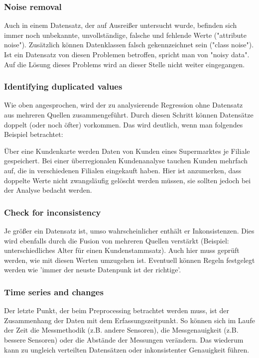 \subsubsection{Noise removal}
Auch in einem Datensatz, der auf Ausreißer untersucht wurde, befinden sich immer noch unbekannte, unvollständige, falsche und fehlende Werte ("attribute noise"). Zusätzlich können Datenklassen falsch gekennzeichnet sein ("class noise"). Ist ein Datensatz von diesen Problemen betroffen, spricht man von "noisy data". Auf die Lösung dieses Problems wird an dieser Stelle nicht weiter eingegangen. 

\subsubsection{Identifying duplicated values}
Wie oben angesprochen, wird der zu analysierende Regression ohne Datensatz aus mehreren Quellen zusammengeführt. Durch diesen Schritt können Datensätze doppelt (oder noch öfter) vorkommen. Das wird deutlich, wenn man folgendes Beispiel betrachtet: \par
Über eine Kundenkarte werden Daten von Kunden eines Supermarktes je Filiale gespeichert. Bei einer überregionalen Kundenanalyse tauchen Kunden mehrfach auf, die in verschiedenen Filialen eingekauft haben. Hier ist anzumerken, dass doppelte Werte nicht zwangsläufig gelöscht werden müssen, sie sollten jedoch bei der Analyse bedacht werden.

\subsubsection{Check for inconsistency}
Je größer ein Datensatz ist, umso wahrscheinlicher enthält er Inkonsistenzen. Dies wird ebenfalls durch die Fusion von mehreren Quellen verstärkt (Beispiel: unterschiedliches Alter für einen Kundenstammsatz). Auch hier muss geprüft werden, wie mit diesen Werten umzugehen ist. Eventuell können Regeln festgelegt werden wie 'immer der neuste Datenpunk ist der richtige'.

\subsubsection{Time series and changes}
Der letzte Punkt, der beim Preprocessing betrachtet werden muss, ist der Zusammenhang der Daten mit dem Erfassungszeitpunkt. So können sich im Laufe der Zeit die Messmethodik (z.B. andere Sensoren), die Messgenauigkeit (z.B. bessere Sensoren) oder die Abstände der Messungen verändern. Das wiederum kann zu ungleich verteilten Datensätzen oder inkonsistenter Genauigkeit führen.

